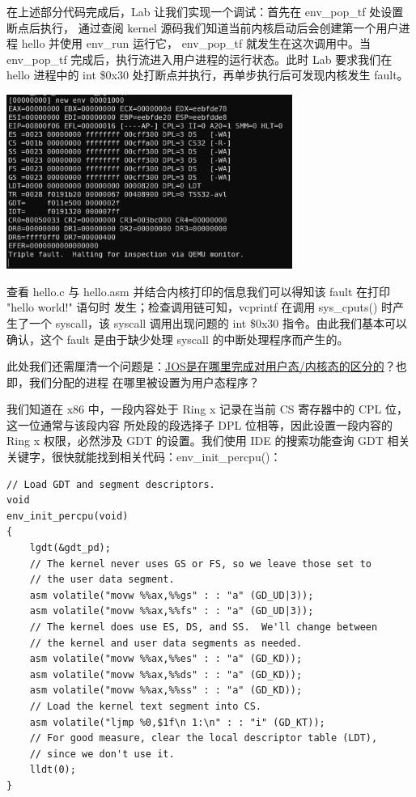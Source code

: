 \documentclass[12pt, letterpaper]{report}
\begin{document}
\newpage
在上述部分代码完成后，Lab 让我们实现一个调试：首先在 env\_pop\_tf 处设置断点后执行，
通过查阅 kernel 源码我们知道当前内核启动后会创建第一个用户进程 hello 并使用 env\_run 运行它，
env\_pop\_tf 就发生在这次调用中。当 env\_pop\_tf 完成后，执行流进入用户进程的运行状态。此时 
Lab 要求我们在 hello 进程中的 int \$0x30 处打断点并执行，再单步执行后可发现内核发生 fault。\par
\quad \par 
{
\centering
\includegraphics[width=0.7\textwidth]{hellofault} \par
}
\quad \par 
查看 hello.c 与 hello.asm 并结合内核打印的信息我们可以得知该 fault 在打印 "hello world!" 语句时
发生；检查调用链可知，vcprintf 在调用 sys\_cputs() 时产生了一个 syscall，该 syscall 调用出现问题的 
int \$0x30 指令。由此我们基本可以确认，这个 fault 是由于缺少处理 syscall 的中断处理程序而产生的。\par
此处我们还需厘清一个问题是：\underline{JOS是在哪里完成对用户态/内核态的区分的}？也即，我们分配的进程
在哪里被设置为用户态程序？ \par
我们知道在 x86 中，一段内容处于 Ring x 记录在当前 CS 寄存器中的 CPL 位，这一位通常与该段内容
所处段的段选择子 DPL 位相等，因此设置一段内容的 Ring x 权限，必然涉及 GDT 的设置。我们使用 IDE 
的搜索功能查询 GDT 相关关键字，很快就能找到相关代码：env\_init\_percpu()：\par
\newpage
\lstset{style=CStyle}
\setmainfont{Consolas}
\begin{lstlisting}
// Load GDT and segment descriptors.
void
env_init_percpu(void)
{
    lgdt(&gdt_pd);
    // The kernel never uses GS or FS, so we leave those set to
    // the user data segment.
    asm volatile("movw %%ax,%%gs" : : "a" (GD_UD|3));
    asm volatile("movw %%ax,%%fs" : : "a" (GD_UD|3));
    // The kernel does use ES, DS, and SS.  We'll change between
    // the kernel and user data segments as needed.
    asm volatile("movw %%ax,%%es" : : "a" (GD_KD));
    asm volatile("movw %%ax,%%ds" : : "a" (GD_KD));
    asm volatile("movw %%ax,%%ss" : : "a" (GD_KD));
    // Load the kernel text segment into CS.
    asm volatile("ljmp %0,$1f\n 1:\n" : : "i" (GD_KT));
    // For good measure, clear the local descriptor table (LDT),
    // since we don't use it.
    lldt(0);
}
\end{lstlisting}
\end{document}
